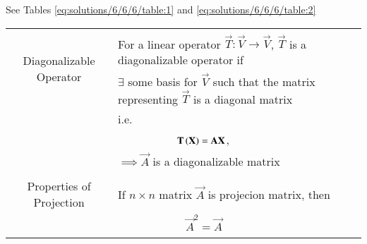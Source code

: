 See Tables     \ref{eq:solutions/6/6/6/table:1} and     \ref{eq:solutions/6/6/6/table:2}



\begin{table*}[ht!]
\centering
\begin{tabular}{|c|l|}
    \hline
    \multirow{3}{*}{Diagonalizable Operator} 
	& \\
	& For a linear operator $\vec{T}\colon \vec{V}\longrightarrow \vec{V}$, $\vec{T}$ is a diagonalizable operator if \\
	& $\exists$ some basis for $\Vec{V}$ such that the matrix representing $\vec{T}$ is a diagonal matrix\\
	&i.e.\\
	& $\qquad\qquad\qquad \vec{T}\brak{\vec{X}}=\Vec{A}\Vec{X}$,\\
    &$\implies \vec{A}$ is a diagonalizable matrix\\
	&\\
	\hline
	\multirow{3}{*}{Properties of Projection} 
	& \\
	& If $n\times n$ matrix $\vec{A}$ is projecion matrix, then\\
	&\\
	&$\qquad\qquad\qquad \vec{A}^2=\vec{A}$\\
	&\\
	\hline
\end{tabular}
    \caption{Definitions}
\label{eq:solutions/6/6/6/table:1}
\end{table*}
\onecolumn
